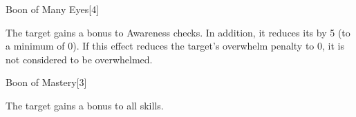 \begin{spellsection}{Boon of Many Eyes}[4]
    \begin{spellheader}
    \end{spellheader}
    \begin{spellcontent}
        \begin{spelltargetinginfo}
        \end{spelltargetinginfo}
        \begin{spelleffects}
            \spelleffect The target gains a  bonus to Awareness checks.
            In addition, it reduces its  by 5 (to a minimum of 0).
            If this effect reduces the target's overwhelm penalty to 0, it is not considered to be overwhelmed.
            \spelldur \durshort
        \end{spelleffects}
    \end{spellcontent}
    \begin{spellfooter}
        \miscastrandom
    \end{spellfooter}
\end{spellsection}

\begin{spellsection}{Boon of Mastery}[3]
    \begin{spellheader}
    \end{spellheader}
    \begin{spellcontent}
        \begin{spelltargetinginfo}
        \end{spelltargetinginfo}
        \begin{spelleffects}
            \spelleffect The target gains a  bonus to all skills.
            \spelldur \durshort
        \end{spelleffects}
    \end{spellcontent}
    \begin{spellfooter}
        \miscastrandom
    \end{spellfooter}
\end{spellsection}

